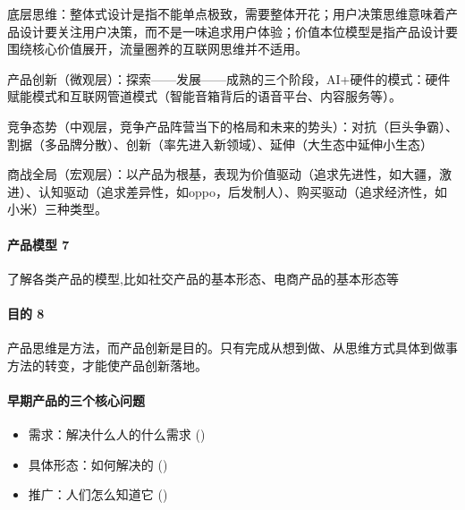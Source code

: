 \documentclass[letterpaper,10pt,english]{sphinxmanual}
\begin{document}
底层思维：整体式设计是指不能单点极致，需要整体开花；用户决策思维意味着产品设计要关注用户决策，而不是一味追求用户体验；价值本位模型是指产品设计要围绕核心价值展开，流量圈养的互联网思维并不适用。

产品创新（微观层）：探索——发展——成熟的三个阶段，AI+硬件的模式：硬件赋能模式和互联网管道模式（智能音箱背后的语音平台、内容服务等）。

竞争态势（中观层，竞争产品阵营当下的格局和未来的势头）：对抗（巨头争霸）、割据（多品牌分散）、创新（率先进入新领域）、延伸（大生态中延伸小生态）

商战全局（宏观层）：以产品为根基，表现为价值驱动（追求先进性，如大疆，激进）、认知驱动（追求差异性，如oppo，后发制人）、购买驱动（追求经济性，如小米）三种类型。


\paragraph{产品模型 7\sphinxfootnotemark[51]}
\label{\detokenize{chapter_introduction/Product:id43}}%
\begin{footnotetext}[51]\sphinxAtStartFootnote
{}
%
\end{footnotetext}\ignorespaces 
了解各类产品的模型,比如社交产品的基本形态、电商产品的基本形态等


\paragraph{目的 8\sphinxfootnotemark[52]}
\label{\detokenize{chapter_introduction/Product:id44}}%
\begin{footnotetext}[52]\sphinxAtStartFootnote
{}
%
\end{footnotetext}\ignorespaces 
产品思维是方法，而产品创新是目的。只有完成从想到做、从思维方式具体到做事方法的转变，才能使产品创新落地。


\paragraph{早期产品的三个核心问题}
\label{\detokenize{chapter_introduction/Product:id45}}\begin{itemize}
\item {} 
需求：解决什么人的什么需求 {\hyperref[\detokenize{chapter_introduction/need:need}]{}} ()

\item {} 
具体形态：如何解决的 {\hyperref[\detokenize{chapter_knowledge/index:chap-skill}]{}} ()

\item {} 
推广：人们怎么知道它 {\hyperref[\detokenize{chapter_idea/GTM:yunying}]{}} ()

\end{itemize}
\end{document}
